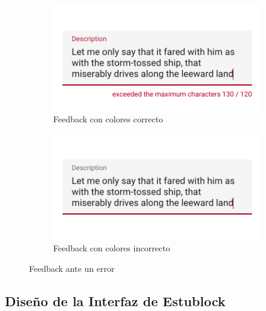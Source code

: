 \begin{figure}[hbt]
	\centering
	\begin{subfigure}[b]{0.4\linewidth}
		\centering
        \includegraphics[width=1\linewidth]{figs/Desarrollo/Accesibilidad/errorbien}
        \caption[Feedback con colores correcto]{Feedback con colores correcto}
	\end{subfigure} 
	\begin{subfigure}[b]{0.4\linewidth}
		\centering
        \includegraphics[width=1\linewidth]{figs/Desarrollo/Accesibilidad/errormal}
        \caption[Feedback con colores incorrecto]{Feedback con colores incorrecto}
	\end{subfigure} 
	\caption[Feedback ante un error]{Feedback ante un error}
	\label{fig:error}
\end{figure}

\vspace{1cm}

\subsection{Diseño de la Interfaz de Estublock}

